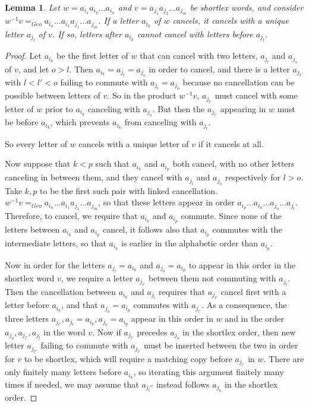 \documentclass[10pt,a4paper]{amsart}
\newtheorem{lemma}[theorem]{Lemma}
\theoremstyle{definition}
\theoremstyle{remark}
\begin{document}
	
	\begin{lemma}\label{ShortlexNonLinking}
		Let $w=a_{i_1}a_{i_2}...a_{i_n}$ and $v=a_{j_1}a_{j_2}...a_{j_m}$ be shortlex words, and consider $w^{-1}v=_{Geo}a_{i_n}...a_{i_1}a_{j_1}...a_{j_m}$. If a letter $a_{i_k}$ of $w$ cancels, it cancels with a unique letter $a_{j_l}$ of $v$. If so, letters after $a_{i_k}$ cannot cancel with letters before $a_{j_l}$.		
	\end{lemma}
	
	\begin{proof}
		Let $a_{i_k}$ be the first letter of $w$ that can cancel with two letters, $a_{j_l}$ and $a_{j_{o}}$ of $v$, and let $o>l$. Then $a_{i_k}=a_{j_l}=a_{j_{o}}$ in order to cancel, and there is a letter $a_{j_{l'}}$ with $l<l'<o$ failing to commute with $a_{j_l}=a_{j_{o}}$ because no cancellation can be possible between letters of $v$. So in the product $w^{-1}v$, $a_{j_{l'}}$ must cancel with some letter of $w$ prior to $a_{i_k}$ canceling with $a_{j_{o}}$. But then the $a_{j_{l'}}$ appearing in $w$ must be before $a_{i_k}$, which prevents $a_{i_k}$ from canceling with $a_{j_l}$.
		
		So every letter of $w$ cancels with a unique letter of $v$ if it cancels at all. 
		
		Now suppose that $k<p$ such that $a_{i_k}$ and $a_{i_p}$ both cancel, with no other letters canceling in between them, and they cancel with $a_{j_l}$ and $a_{j_o}$ respectively for $l>o$. Take $k, p$ to be the first such pair with linked cancellation.  $w^{-1}v=_{Geo}a_{i_n}...a_{i_1}a_{j_1}...a_{j_m}$, so that these letters appear in order $a_{i_{p}}...a_{i_k}...a_{j_o}...a_{j_{l}}$. Therefore, to cancel, we require that $a_{i_k}$ and $a_{i_p}$ commute. Since none of the letters between $a_{i_k}$ and $a_{i_{p}}$ cancel, it follows also that $a_{i_{p}}$ commutes with the intermediate letters, so that $a_{i_k}$ is earlier in the alphabetic order than $a_{i_{p}}$. 
		
		Now in order for the letters $a_{j_l}=a_{i_{k}}$ and $a_{j_{o}}=a_{i_p}$ to appear in this order in the shortlex word $v$, we require a letter $a_{j_{l'}}$ between them not commuting with $a_{j_{l}}$. Then the cancellation between $a_{i_k}$ and $a_{j_{l}}$ requires that $a_{j_{l'}}$ cancel first with a letter before $a_{i_k}$, and that $a_{j_o}=a_{i_{p}}$ commutes with $a_{j_{l'}}$. As a consequence, the three letters $a_{j_{l'}}, a_{j_{l}}=a_{i_k}, a_{j_o}=a_{i_p}$ appear in this order in $w$ and in the order $a_{j_o}, a_{j_{l'}}, a_{j_{l}}$ in the word $v$. Now if $a_{j_{l'}}$ precedes $a_{j_o}$ in the shortlex order, then new letter $a_{j_{l''}}$ failing to commute with $a_{j_{l'}}$ must be inserted between the two in order for $v$ to be shortlex, which will require a matching copy before $a_{j_{l'}}$ in $w$. There are only finitely many letters before $a_{i_k}$, so iterating this argument finitely many times if needed, we may assume that $a_{j_l''}$ instead follows $a_{j_o}$ in the shortlex order.
		

\end{proof}
\end{document}
